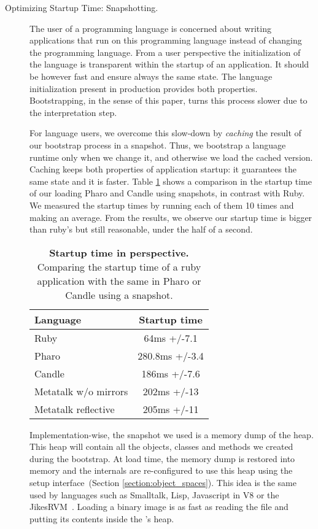 \begin{description}
\item[Optimizing Startup Time: Snapshotting.]\label{sec:snapshot}
The user of a programming language is concerned about writing applications that run on this programming language instead of changing the programming language. From a user perspective the initialization of the language is transparent within the startup of an application. It should be however fast and ensure always the same state.
The language initialization present in production \VMs provides both properties. Bootstrapping, in the sense of this paper, turns this process slower due to the interpretation step.

For language users, we overcome this slow-down by \emph{caching} the result of our bootstrap process in a snapshot. Thus, we bootstrap a language runtime only when we change it, and otherwise we load the cached version. Caching keeps both properties of application startup: it guarantees the same state and it is faster. Table \ref{tb:startup} shows a comparison in the startup time of our \VM loading Pharo and Candle using snapshots, in contrast with Ruby. We measured the startup times by running each of them 10 times and making an average. From the results, we observe our startup time is bigger than ruby's but still reasonable, under the half of a second.

 \begin{table}[ht]
 \small
 	\centering
 	\begin{tabular}{|l|c|}
			\hline
			\textbf{Language}
 			& \textbf{Startup time}\\
		\hline
		Ruby &  64ms +/-7.1\\\hline
		Pharo & 280.8ms +/-3.4\\\hline
		Candle & 186ms +/-7.6\\\hline
		Metatalk w/o mirrors &202ms +/-13\\\hline
		Metatalk reflective &205ms +/-11\\\hline
 	\end{tabular}
	\vspace*{0.2cm}
 	\caption{\small\textbf{Startup time in perspective.} Comparing the startup time of a ruby application with the same in Pharo or Candle using a snapshot.\label{tb:startup}}
 \end{table}

Implementation-wise, the snapshot we used is a memory dump of the \VM heap. This heap will contain all the objects, classes and methods we created during the bootstrap. At load time, the memory dump is restored into memory and the \VM internals are re-configured to use this heap using the \VM setup interface~(Section \ref{section:object_spaces}). This idea is the same used by languages such as Smalltalk, Lisp, Javascript in V8 or the JikesRVM~\cite{Alpe00a}. Loading a binary image is as fast as reading the file and putting its contents inside the \VM's heap.

\end{description}

